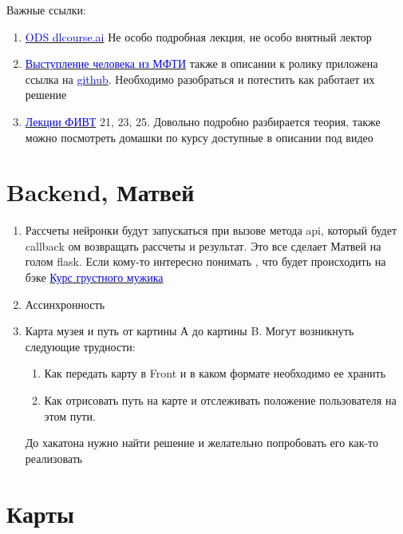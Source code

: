 \documentclass[11pt]{article}
\begin{document}
Важные ссылки:
\begin{enumerate}
\item \href{https://www.youtube.com/watch?v=JpS0LzEWr-4}{\textcolor{blue}{ODS dlcourse.ai}} Не особо подробная лекция, не особо внятный лектор 
\item \href{https://www.youtube.com/watch?v=eke2h9fGtu0}{\textcolor{blue}{Выступление человека из МФТИ}} также в описании к ролику приложена ссылка на \href{https://github.com/nsu-ai-team/voxforge_ru_sphinx_experiments}{\textcolor{blue}{github}}. Необходимо разобраться и потестить как работает их решение
\item \href{https://www.youtube.com/playlist?list=PL0Ks75aof3ThkitsZbUOEQg7Ybl5kB_s3}{\textcolor{blue}{Лекции ФИВТ}} 21, 23, 25. Довольно подробно разбирается теория, также можно посмотреть домашки по курсу доступные в описании под видео

\end{enumerate}

\section{Backend, {Матвей}}

\begin{enumerate}

\item Рассчеты нейронки будут запускаться при вызове метода api, который будет callback ом возвращать рассчеты и результат. Это все сделает Матвей на голом flask. Если кому-то интересно понимать , что будет происходить на бэке \href{https://blog.miguelgrinberg.com/post/the-flask-mega-tutorial-part-i-hello-world}{\textcolor{blue}{Курс грустного мужика}}
\item Ассинхронность 
\item Карта музея и путь от картины А до картины B. Могут возникнуть следующие трудности:
\begin{enumerate}
\item Как передать карту в Front и в каком формате необходимо ее хранить 
\item Как отрисовать путь на карте и отслеживать положение пользователя на этом пути. 
\end{enumerate}
До хакатона нужно найти решение и желательно попробовать его как-то реализовать
\end{enumerate}

\section{Карты}
\end{document}
